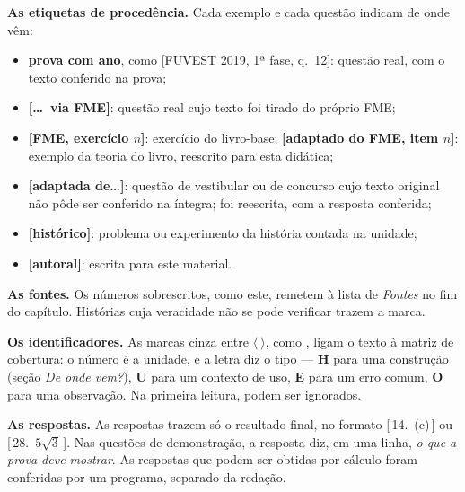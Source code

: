 \textbf{As etiquetas de procedência.} Cada exemplo e cada questão indicam de onde vêm:
\begin{itemize}[leftmargin=1.4em,itemsep=1pt]
  \item \textbf{prova com ano}, como [FUVEST 2019, 1ª fase, q.~12]: questão real, com o texto conferido na prova;
  \item \textbf{[\ldots\ via FME]}: questão real cujo texto foi tirado do próprio FME;
  \item \textbf{[FME, exercício $n$]}: exercício do livro-base; \textbf{[adaptado do FME, item $n$]}: exemplo da teoria do livro, reescrito para esta didática;
  \item \textbf{[adaptada de\ldots]}: questão de vestibular ou de concurso cujo texto original não pôde ser conferido na íntegra; foi reescrita, com a resposta conferida;
  \item \textbf{[histórico]}: problema ou experimento da história contada na unidade;
  \item \textbf{[autoral]}: escrita para este material.
\end{itemize}

\textbf{As fontes.} Os números sobrescritos, como este, remetem à lista de \emph{Fontes} no fim do capítulo. Histórias cuja veracidade não se pode verificar trazem a marca\anedota.

\textbf{Os identificadores.} As marcas cinza entre $\langle\ \rangle$, como , ligam o texto à matriz de cobertura: o número é a unidade, e a letra diz o tipo — \textbf{H} para uma construção (seção \emph{De onde vem?}), \textbf{U} para um contexto de uso, \textbf{E} para um erro comum, \textbf{O} para uma observação. Na primeira leitura, podem ser ignorados.

\textbf{As respostas.} As respostas trazem só o resultado final, no formato [\,14.\ (c)\,] ou [\,28.\ $5\sqrt3$\,]. Nas questões de demonstração, a resposta diz, em uma linha, \emph{o que a prova deve mostrar}. As respostas que podem ser obtidas por cálculo foram conferidas por um programa, separado da redação.
\clearpage
